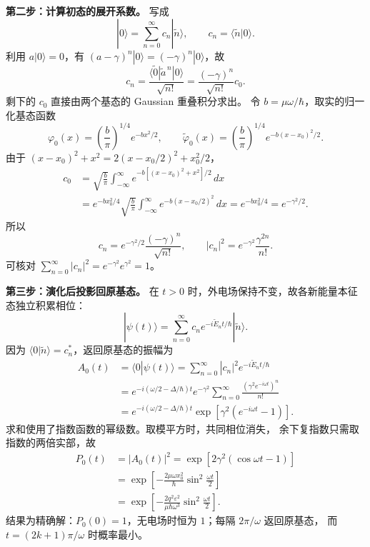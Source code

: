 \begin{enumerate}
{\begin{enumerate}
	\textbf{第二步：计算初态的展开系数。}
	写成
	\[
	 |0\rangle=\sum_{n=0}^\infty c_n|\widetilde n\rangle,\qquad
	 c_n=\langle\widetilde n|0\rangle.
	\]
	利用 $a|0\rangle=0$，有 $(a-\gamma)^n|0\rangle=(-\gamma)^n|0\rangle$，故
	\[
	 c_n=\frac{\langle\widetilde0|\widetilde a^{\,n}|0\rangle}{\sqrt{n!}}
	     =\frac{(-\gamma)^n}{\sqrt{n!}}c_0.
	\]
	剩下的 $c_0$ 直接由两个基态的 Gaussian 重叠积分求出。
	令 $b=\mu\omega/\hbar$，取实的归一化基态函数
	\[
	 \varphi_0(x)=\left(\frac b\pi\right)^{1/4}e^{-bx^2/2},\qquad
	 \widetilde\varphi_0(x)=\left(\frac b\pi\right)^{1/4}e^{-b(x-x_0)^2/2}.
	\]
	由于 $(x-x_0)^2+x^2=2(x-x_0/2)^2+x_0^2/2$，
	\begin{align*}
	 c_0&=\sqrt{\frac b\pi}\int_{-\infty}^\infty
	       e^{-b[(x-x_0)^2+x^2]/2}\,dx\\
	    &=e^{-bx_0^2/4}\sqrt{\frac b\pi}\int_{-\infty}^\infty
	       e^{-b(x-x_0/2)^2}\,dx
	     =e^{-bx_0^2/4}=e^{-\gamma^2/2}.
	\end{align*}
	所以
	\[
	 \boxed{c_n=e^{-\gamma^2/2}\frac{(-\gamma)^n}{\sqrt{n!}}},\qquad
	 |c_n|^2=e^{-\gamma^2}\frac{\gamma^{2n}}{n!}.
	\]
	可核对 $\sum_{n=0}^\infty|c_n|^2=e^{-\gamma^2}e^{\gamma^2}=1$。

	\textbf{第三步：演化后投影回原基态。}
	在 $t>0$ 时，外电场保持不变，故各新能量本征态独立积累相位：
	\[
	 |\psi(t)\rangle=\sum_{n=0}^\infty
	 c_n e^{-i\widetilde E_nt/\hbar}|\widetilde n\rangle.
	\]
	因为 $\langle0|\widetilde n\rangle=c_n^*$，返回原基态的振幅为
	\begin{align*}
	 A_0(t)&=\langle0|\psi(t)\rangle
	 =\sum_{n=0}^\infty|c_n|^2e^{-i\widetilde E_nt/\hbar}\\
	 &=e^{-i(\omega/2-\Delta/\hbar)t}e^{-\gamma^2}
	   \sum_{n=0}^\infty\frac{(\gamma^2e^{-i\omega t})^n}{n!}\\
	 &=e^{-i(\omega/2-\Delta/\hbar)t}
	   \exp\!\left[\gamma^2(e^{-i\omega t}-1)\right].
	\end{align*}
	求和使用了指数函数的幂级数。取模平方时，共同相位消失，
	余下复指数只需取指数的两倍实部，故
	\begin{align*}
	 P_0(t)&=|A_0(t)|^2
	 =\exp\!\left[2\gamma^2(\cos\omega t-1)\right]\\
	 &=\boxed{\exp\!\left[-\frac{2\mu\omega x_0^2}{\hbar}
	                 \sin^2\frac{\omega t}{2}\right]}\\
	 &=\boxed{\exp\!\left[-\frac{2q^2\varepsilon^2}{\mu\hbar\omega^3}
	                 \sin^2\frac{\omega t}{2}\right]}.
	\end{align*}
	结果为精确解：$P_0(0)=1$，无电场时恒为 $1$；每隔 $2\pi/\omega$ 返回原基态，
	而 $t=(2k+1)\pi/\omega$ 时概率最小。
\end{enumerate}
}


\end{enumerate}
